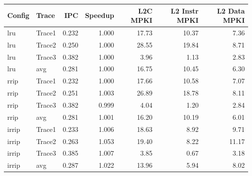\begin{tabular}{llrrrrr}
\toprule
Config & Trace & IPC & Speedup & L2C MPKI & L2 Instr MPKI & L2 Data MPKI \\
\midrule
lru & Trace1 & 0.232 & 1.000 & 17.73 & 10.37 & 7.36 \\
lru & Trace2 & 0.250 & 1.000 & 28.55 & 19.84 & 8.71 \\
lru & Trace3 & 0.382 & 1.000 & 3.96 & 1.13 & 2.83 \\
lru & avg & 0.281 & 1.000 & 16.75 & 10.45 & 6.30 \\
\midrule
rrip & Trace1 & 0.232 & 1.000 & 17.66 & 10.58 & 7.07 \\
rrip & Trace2 & 0.251 & 1.003 & 26.89 & 18.78 & 8.11 \\
rrip & Trace3 & 0.382 & 0.999 & 4.04 & 1.20 & 2.84 \\
rrip & avg & 0.281 & 1.001 & 16.20 & 10.19 & 6.01 \\
\midrule
irrip & Trace1 & 0.233 & 1.006 & 18.63 & 8.92 & 9.71 \\
irrip & Trace2 & 0.263 & 1.053 & 19.40 & 8.22 & 11.17 \\
irrip & Trace3 & 0.385 & 1.007 & 3.85 & 0.67 & 3.18 \\
irrip & avg & 0.287 & 1.022 & 13.96 & 5.94 & 8.02 \\
\midrule
\bottomrule
\end{tabular}
